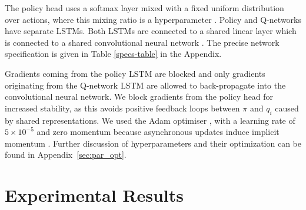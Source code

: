 \documentclass{article}
\begin{document}
The policy head uses a softmax layer mixed with a fixed 
uniform distribution over actions, where this mixing ratio is a 
hyperparameter \citep[Section 5.1.3]{wiering1999explorations}. Policy and 
Q-networks have separate LSTMs. 
Both LSTMs are connected to a shared 
linear layer which is connected to a shared convolutional neural network 
\citep{krizhevsky2012imagenet}. The precise network
specification is given in Table 
\ref{specs-table} in the Appendix.

Gradients coming from the policy LSTM are blocked and only gradients 
originating from the Q-network LSTM are allowed to back-propagate into the convolutional 
neural network. We block gradients 
from the policy head for increased stability, as this avoids positive feedback 
loops between $\pi$ and $q_i$ caused by shared representations. We used the Adam optimiser \citep{kingma2014adam}, with a learning rate of $5 \times 10^{-5}$ 
and zero momentum because asynchronous updates induce 
implicit momentum \citep{mitliagkas2016asynchrony}. 
Further discussion of hyperparameters and their optimization can be found in Appendix~\ref{sec:par_opt}.



\section{Experimental Results}\label{sec:results}
\iffalse
\begin{figure}
\centering
\vspace{0pt}
\begin{minipage}{.32\textwidth}
  \centerline{\texttt{[image: aggregate\_mean]}}
\end{minipage}\vspace{0pt}
\begin{minipage}{.32\textwidth}
\vspace{0pt}
  \centering
  \texttt{[image: aggregate\_median]}
\end{minipage}
\begin{minipage}{.32\textwidth}
\vspace{0pt}
  \centering
  \texttt{[image: scaling\_median]}
\end{minipage}
  \caption{
  \small 'Reactor' includes distributional Retrace 
     algorithm, prioritized replay and beta-LOO policy 
     gradient with $\beta=1$. The other curves show algorithms 
     performance by removing each of the components and changing the number of 
     workers.}
  \label{learningcurves}
\end{figure}
\fi
\end{document}

